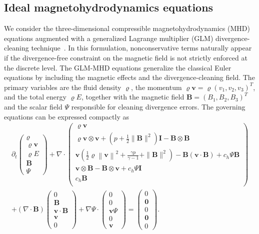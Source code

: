 \documentclass[]{scrartcl}
\renewcommand{\vec}[1]{\boldsymbol{#1}}
\theoremstyle{definition}
\begin{document}
\subsection{Ideal magnetohydrodynamics equations}
We consider the three-dimensional compressible magnetohydrodynamics (MHD) equations augmented with a generalized Lagrange multiplier (GLM) divergence-cleaning technique~\cite{Derigs2018420, bohm2018entropy}.
In this formulation, nonconservative
terms naturally appear if the divergence-free constraint on the magnetic field is
not strictly enforced at the discrete level.
The GLM-MHD equations generalize the classical Euler equations by including the magnetic effects and the divergence-cleaning field.
The primary variables are the fluid density $\varrho$, the momentum $\varrho \vec{v} = \varrho ( v_1, v_2, v_3)^T$, and the total energy $\varrho E$, together with the magnetic field $\vec{B} = (B_1, B_2, B_3)^T$ and the scalar field $\Psi$ responsible for cleaning divergence errors.
The governing equations can be expressed compactly as~\cite{Derigs2018420, bohm2018entropy}
\begin{multline}
    \label{eq:glm-mhd}
\partial_t
\begin{pmatrix} \varrho \\ \varrho \vec{v} \\ \varrho E \\ \vec{B} \\ \Psi
\end{pmatrix}
+
\nabla \cdot
\begin{pmatrix}
\varrho \vec{v} \\
\varrho \vec{v} \otimes \vec{v} + \left (p + \frac{1}{2} \|\vec{B}\|^2 \right )\vec{I} - \vec{B} \otimes \vec{B}
 \\
\vec{v}\left (\frac{1}{2}\varrho \left\|\vec{v}\right\|^2 + \frac{\gamma p}{\gamma -1} + \|\vec{B}\|^2 \right )
- \vec{B}\left (\vec{v}\cdot\vec{B}\right )
+ c_h \Psi \vec{B}
 \\
 \vec{v}\otimes \vec{B} - \vec{B}\otimes \vec{v}
+ c_h \Psi \vec{I} \\
 c_h \vec{B} \\
\end{pmatrix}
\\
 +
(\nabla \cdot \vec{B})
\begin{pmatrix}
 0 \\ \vec{B} \\ \vec{v} \cdot \vec{B} \\  \vec{v}
\\ 0
\end{pmatrix}
 +
\nabla \Psi \cdot
\begin{pmatrix}
 0 \\ 0 \\ \vec{v}\Psi \\  0 \\ \vec{v}
\end{pmatrix}
 =
 \begin{pmatrix}
     0 \\ \vec{0} \\ 0 \\ \vec{0} \\ 0
 \end{pmatrix}.
\end{multline}
\end{document}
